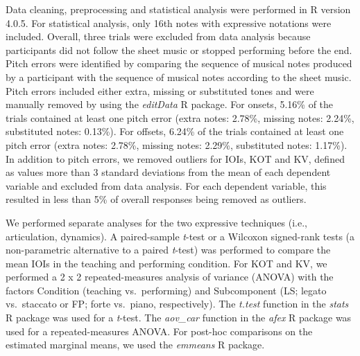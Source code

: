 \documentclass[
  english,
  man,floatsintext]{apa6}
\begin{document}
Data cleaning, preprocessing and statistical analysis were performed in R version 4.0.5. For statistical analysis, only 16th notes with expressive notations were included. Overall, three trials were excluded from data analysis because participants did not follow the sheet music or stopped performing before the end. Pitch errors were identified by comparing the sequence of musical notes produced by a participant with the sequence of musical notes according to the sheet music. Pitch errors included either extra, missing or substituted tones and were manually removed by using the \emph{editData} R package. For onsets, 5.16\% of the trials contained at least one pitch error (extra notes: 2.78\%, missing notes: 2.24\%, substituted notes: 0.13\%). For offsets, 6.24\% of the trials contained at least one pitch error (extra notes: 2.78\%, missing notes: 2.29\%, substituted notes: 1.17\%). In addition to pitch errors, we removed outliers for IOIs, KOT and KV, defined as values more than 3 standard deviations from the mean of each dependent variable and excluded from data analysis. For each dependent variable, this resulted in less than 5\% of overall responses being removed as outliers.

We performed separate analyses for the two expressive techniques (i.e., articulation, dynamics). A paired-sample \emph{t}-test or a Wilcoxon signed-rank tests (a non-parametric alternative to a paired \emph{t}-test) was performed to compare the mean IOIs in the teaching and performing condition. For KOT and KV, we performed a 2 x 2 repeated-measures analysis of variance (ANOVA) with the factors Condition (teaching vs.~performing) and Subcomponent (LS; legato vs.~staccato or FP; forte vs.~piano, respectively). The \emph{t.test} function in the \emph{stats} R package was used for a \emph{t}-test. The \emph{aov\_car} function in the \emph{afex} R package was used for a repeated-measures ANOVA. For post-hoc comparisons on the estimated marginal means, we used the \emph{emmeans} R package.
\end{document}
